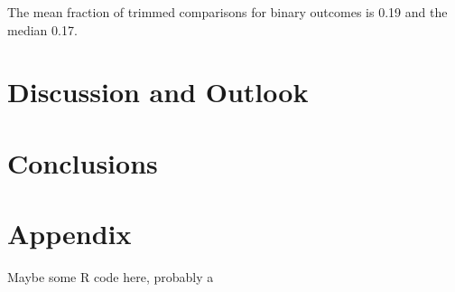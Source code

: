 \documentclass[11pt,a4paper,twoside]{book}\usepackage[]{graphicx}\usepackage[]{color}
\begin{document}
The mean fraction of trimmed comparisons for binary outcomes is 0.19 and the median 0.17.






\chapter{Discussion and Outlook}






\chapter{Conclusions}


\appendix




\chapter{Appendix}

Maybe some R code here, probably a 




\cleardoublepage
{}
{}


 


\cleardoublepage
\end{document}
